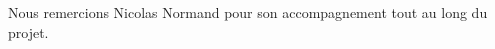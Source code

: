 \documentclass[11pt, french, screen]{report-rd-info}
\begin{document}
\maketitle


\begin{acknowledgements}
Nous remercions Nicolas Normand pour son accompagnement tout au long du projet.

\end{acknowledgements}


\newpage

\tableofcontents






\end{document}
